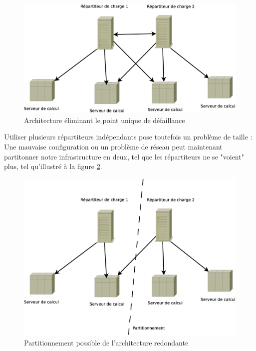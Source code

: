 \begin{figure}
  \includegraphics[width=\linewidth]{Arch_2.eps}
  \caption{Architecture éliminant le point unique de défaillance}
  \label{fig:arch_2}
\end{figure}




Utiliser plusieurs répartiteurs indépendants pose toutefois un problème de taille : Une mauvaise configuration ou un problème 
de réseau peut maintenant partitonner notre infrastructure en deux, tel que les répartiteurs ne se "voient" plus, tel qu'illustré à la figure \ref{fig:arch_part}.

\begin{figure}
  \includegraphics[width=\linewidth]{Arch_2_part.eps}
  \caption{Partitionnement possible de l'architecture redondante}
  \label{fig:arch_part}
\end{figure}

